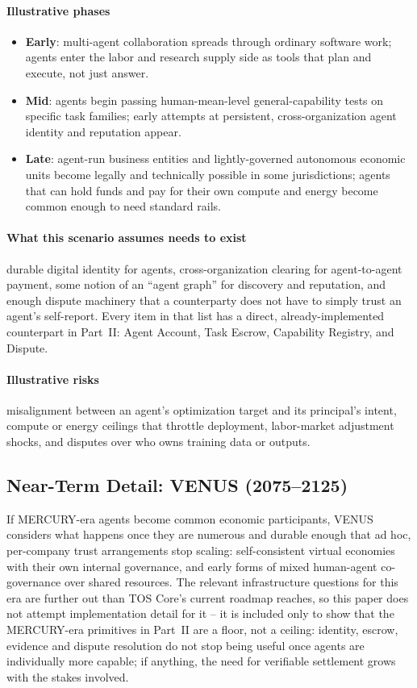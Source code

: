 \documentclass[11pt,oneside]{article}
\begin{document}
\paragraph{Illustrative phases}
\begin{itemize}[noitemsep]
  \item \textbf{Early}: multi-agent collaboration spreads through ordinary software work; agents
  enter the labor and research supply side as tools that plan and execute, not just answer.
  \item \textbf{Mid}: agents begin passing human-mean-level general-capability tests on
  specific task families; early attempts at persistent, cross-organization agent identity and
  reputation appear.
  \item \textbf{Late}: agent-run business entities and lightly-governed autonomous economic
  units become legally and technically possible in some jurisdictions; agents that can hold
  funds and pay for their own compute and energy become common enough to need standard rails.
\end{itemize}

\paragraph{What this scenario assumes needs to exist} durable digital identity for agents,
cross-organization clearing for agent-to-agent payment, some notion of an ``agent graph'' for
discovery and reputation, and enough dispute machinery that a counterparty does not have to
simply trust an agent's self-report. Every item in that list has a direct, already-implemented
counterpart in Part~II: Agent Account, Task Escrow, Capability Registry, and Dispute.

\paragraph{Illustrative risks} misalignment between an agent's optimization target and its
principal's intent, compute or energy ceilings that throttle deployment, labor-market
adjustment shocks, and disputes over who owns training data or outputs.

\subsection{Near-Term Detail: VENUS (2075--2125)}

If MERCURY-era agents become common economic participants, VENUS considers what happens once
they are numerous and durable enough that ad hoc, per-company trust arrangements stop
scaling: self-consistent virtual economies with their own internal governance, and early forms
of mixed human-agent co-governance over shared resources. The relevant infrastructure
questions for this era are further out than TOS Core's current roadmap reaches, so this
paper does not attempt implementation detail for it -- it is included only to show that the
MERCURY-era primitives in Part~II are a floor, not a ceiling: identity, escrow, evidence and
dispute resolution do not stop being useful once agents are individually more capable; if
anything, the need for verifiable settlement grows with the stakes involved.
\end{document}
